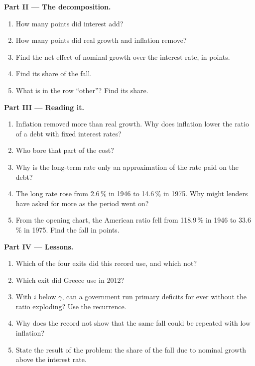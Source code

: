 \begin{problem}
\medskip
\noindent\textbf{Part II --- The decomposition.}
\begin{enumerate}[resume]
\item How many points did interest add?
\item How many points did real growth and inflation remove?
\item Find the net effect of nominal growth over the interest rate, in points.
\item Find its share of the fall.
\item What is in the row ``other''? Find its share.
\end{enumerate}

\medskip
\noindent\textbf{Part III --- Reading it.}
\begin{enumerate}[resume]
\item Inflation removed more than real growth. Why does inflation lower the ratio of a debt with fixed interest rates?
\item Who bore that part of the cost?
\item Why is the long-term rate only an approximation of the rate paid on the debt?
\item The long rate rose from 2.6\,\% in 1946 to 14.6\,\% in 1975. Why might lenders have asked for more as the period went on?
\item From the opening chart, the American ratio fell from 118.9\,\% in 1946 to 33.6\,\% in 1975. Find the fall in points.
\end{enumerate}

\medskip
\noindent\textbf{Part IV --- Lessons.}
\begin{enumerate}[resume]
\item Which of the four exits did this record use, and which not?
\item Which exit did Greece use in 2012?
\item With $i$ below $\gamma$, can a government run primary deficits for ever without the ratio exploding? Use the recurrence.
\item Why does the record not show that the same fall could be repeated with low inflation?
\item State the result of the problem: the share of the fall due to nominal growth above the interest rate.
\end{enumerate}
\end{problem}
